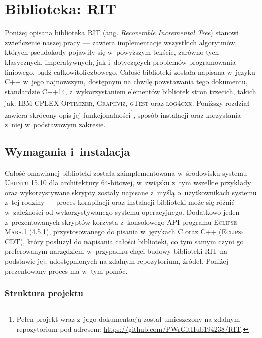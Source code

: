 \chapter{Biblioteka:  RIT}
\label{app:takeMeHome}
\thispagestyle{appendixStyle}

Poniżej opisana biblioteka \textsc{RIT} (ang. \textit{Recoverable Incremental Tree}) stanowi zwieńczenie naszej pracy --- zawiera implementacje wszystkich algorytmów, których pseudokody pojawiły się w~powyższym tekście, zarówno tych klasycznych, imperatywnych, jak i~dotyczących problemów programowania liniowego, bądź całkowitoliczbowego. Całość biblioteki została napisana w~języku \textsc{C++} w~jego najnowszym, dostępnym na chwilę powstawania tego dokumentu, standardzie \textsc{C++14}, z~wykorzystaniem elementów bibliotek stron trzecich, takich jak: \textsc{IBM\textsuperscript{\textregistered} CPLEX\textsuperscript{\textregistered} Optimizer}, \textsc{Graphviz}, \textsc{gTest} oraz \textsc{log4cxx}. Poniższy rozdział zawiera skrócony opis jej funkcjonalności\footnote{Pełen projekt wraz z~jego dokumentacją został umieszczony na zdalnym repozytorium pod adresem: \url{https://github.com/PWrGitHub194238/RIT}.}, sposób instalacji oraz korzystania z~niej w~podstawowym zakresie.

\section{Wymagania i~instalacja}

Całość omawianej biblioteki została zaimplementowana w~środowisku systemu \textsc{Ubuntu 15.10} dla architektury $64$-bitowej, w~związku z~tym wszelkie przykłady oraz wykorzystywane skrypty zostały napisane z~myślą o~użytkownikach systemu z~tej rodziny --- proces kompilacji oraz instalacji biblioteki może się różnić w~zależności od wykorzystywanego systemu operacyjnego. Dodatkowo jeden z~prezentowanych skryptów korzysta z~konsolowego \textsc{API} programu \textsc{Eclipse Mars.1 (4.5.1)}, przystosowanego do pisania w~językach \textsc{C} oraz \textsc{C++} (\textsc{Eclipse CDT}), który posłużył do napisania całości biblioteki, co tym samym czyni go preferowanym narzędziem w~przypadku chęci budowy biblioteki \textsc{RIT} na podstawie jej, udostępnionych na zdalnym repozytorium, źródeł. Poniżej prezentowany proces ma w~tym pomóc. 

\subsection{Struktura projektu}

